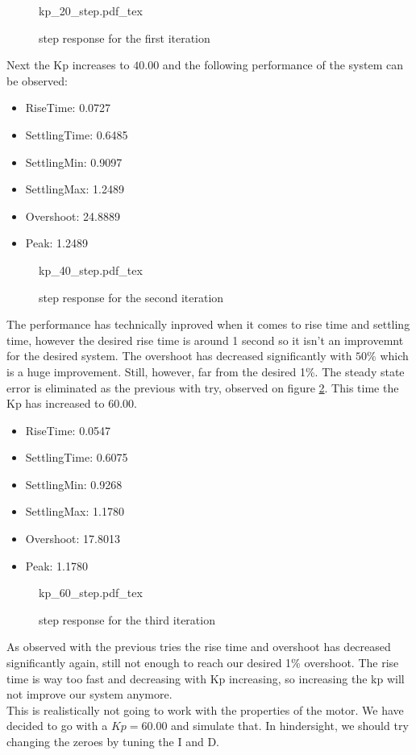 \documentclass[12pt]{article}
\begin{document}
\begin{figure}[H]
  \centering
  \def\svgwidth{0.5\textwidth}
  {kp_20_step.pdf_tex}
  \caption{step response for the first iteration} \label{my_first_step}
\end{figure}
Next the Kp increases to $40.00$ and the following performance of the system can be observed:
\begin{itemize}
  \item RiseTime: 0.0727
  \item SettlingTime: 0.6485
  \item SettlingMin: 0.9097
  \item SettlingMax: 1.2489
  \item Overshoot: 24.8889
  \item Peak: 1.2489
\end{itemize}
\begin{figure}[H]
  \centering
  \def\svgwidth{0.5\textwidth}
  {kp_40_step.pdf_tex}
  \caption{step response for the second iteration} \label{my_second_step}
\end{figure}
The performance has technically inproved when it comes to rise time and settling time, however the desired rise time is around 1 second so it isn't an improvemnt for the desired system. The overshoot has decreased significantly with $50\%$ which is a huge improvement. Still, however, far from the desired 1\%. The steady state error is eliminated as the previous with try, observed on figure \ref{my_second_step}. This time the Kp has increased to $60.00$.
\begin{itemize}
  \item RiseTime: 0.0547
  \item SettlingTime: 0.6075
  \item SettlingMin: 0.9268
  \item SettlingMax:  1.1780
  \item Overshoot: 17.8013
  \item Peak: 1.1780
\end{itemize}
\begin{figure}[H]
  \centering
  \def\svgwidth{0.5\textwidth}
  {kp_60_step.pdf_tex}
  \caption{step response for the third iteration} \label{my_third_step}
\end{figure}
As observed with the previous tries the rise time and overshoot has decreased significantly again, still not enough to reach our desired 1\% overshoot. The rise time is way too fast and decreasing with Kp increasing, so increasing the kp will not improve our system anymore. \\
This is realistically not going to work with the properties of the motor. We have decided to go with a $Kp = 60.00$ and simulate that. In hindersight, we should try changing the zeroes by tuning the I and D.
\end{document}
